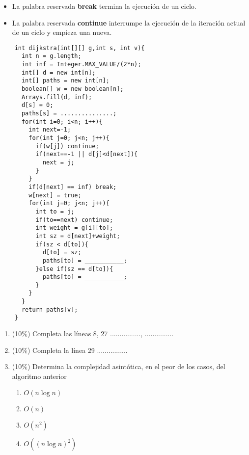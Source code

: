 \documentclass[10 pt]{article}
\begin{document}
\begin{multicols}{2}
\begin{itemize}[noitemsep]
		\item La palabra reservada \textbf{break} termina la ejecución de un ciclo.
		\item La palabra reservada \textbf{continue} interrumpe la ejecución de la iteración actual de un ciclo y empieza una nueva. 
	\end{itemize}
	\begin{center}
	\end{center}
	\begin{lstlisting}
	int dijkstra(int[][] g,int s, int v){
	  int n = g.length;
	  int inf = Integer.MAX_VALUE/(2*n);
	  int[] d = new int[n];
	  int[] paths = new int[n];
	  boolean[] w = new boolean[n];
	  Arrays.fill(d, inf);
	  d[s] = 0;
	  paths[s] = ...............;
	  for(int i=0; i<n; i++){
	    int next=-1;
	    for(int j=0; j<n; j++){
	      if(w[j]) continue;
	      if(next==-1 || d[j]<d[next]){
	        next = j;
	      }
	    }
	    if(d[next] == inf) break;
	    w[next] = true;
	    for(int j=0; j<n; j++){
	      int to = j;
	      if(to==next) continue;
	      int weight = g[i][to];
	      int sz = d[next]+weight;
	      if(sz < d[to]){
	        d[to] = sz;
	        paths[to] = ___________;
	      }else if(sz == d[to]){
	        paths[to] = ___________;
	      }
	    }
	  }
	  return paths[v];
	}
	\end{lstlisting}
	\begin{enumerate}[label=\alph*]
		\item (10\%) Completa las líneas 8, 27 ................, ...............
		\item (10\%) Completa la línea 29 ................
		\item (10\%) Determina la complejidad asintótica, en el peor de los casos, del algoritmo anterior
		\begin{enumerate}[label=\roman*]
			\item $O(n \log n)$
			\item $O(n)$
			\item $O(n^2)$
			\item $O((n \log n) ^ 2)$
		\end{enumerate}
	\end{enumerate}


\end{multicols}
\end{document}
